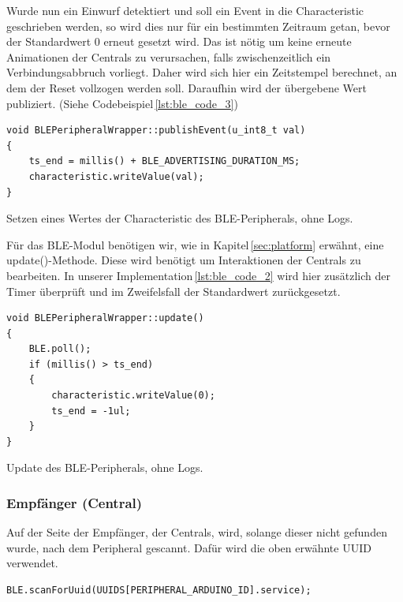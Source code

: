         Wurde nun ein Einwurf detektiert und soll ein Event in die Characteristic geschrieben werden, so wird dies nur für ein bestimmten Zeitraum getan, bevor der Standardwert 0 erneut gesetzt wird.
        Das ist nötig um keine erneute Animationen der Centrals zu verursachen, falls zwischenzeitlich ein Verbindungsabbruch vorliegt.
        Daher wird sich hier ein Zeitstempel berechnet, an dem der Reset vollzogen werden soll.
        Daraufhin wird der übergebene Wert publiziert.
        (Siehe Codebeispiel\,\ref{lst:ble_code_3})\\

        \begin{listing}
            \begin{verbatim}
void BLEPeripheralWrapper::publishEvent(u_int8_t val)
{
    ts_end = millis() + BLE_ADVERTISING_DURATION_MS;
    characteristic.writeValue(val);
}
            \end{verbatim}
            \caption{Setzen eines Wertes der Characteristic des BLE-Peripherals, ohne Logs.
            }
            \label{lst:ble_code_3}
        \end{listing}

        Für das BLE-Modul benötigen wir, wie in Kapitel\,\ref{sec:platform} erwähnt, eine update()-Methode. Diese wird benötigt um Interaktionen der Centrals zu bearbeiten. In unserer Implementation\,\ref{lst:ble_code_2} wird hier zusätzlich der Timer überprüft und im Zweifelsfall der Standardwert zurückgesetzt.

        \begin{listing}
            \begin{verbatim}
void BLEPeripheralWrapper::update()
{
    BLE.poll();
    if (millis() > ts_end) 
    {
        characteristic.writeValue(0);
        ts_end = -1ul;
    }
}
            \end{verbatim}
            \caption{Update des BLE-Peripherals, ohne Logs.
            }
            \label{lst:ble_code_2}
        \end{listing}


    \subsubsection{Empfänger (Central)}

        Auf der Seite der Empfänger, der Centrals, wird, solange dieser nicht gefunden wurde, nach dem Peripheral gescannt. Dafür wird die oben erwähnte UUID verwendet.

        \begin{verbatim}
BLE.scanForUuid(UUIDS[PERIPHERAL_ARDUINO_ID].service);
        \end{verbatim}

